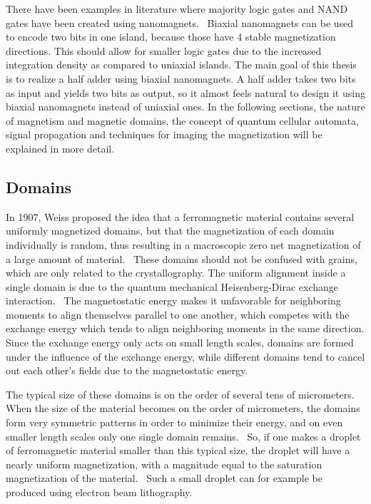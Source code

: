 \documentclass[11pt,a4paper,english]{article}
\begin{document}
There have been examples in literature where majority logic gates and NAND gates have been created using nanomagnets.~\cite{GYP-18} Biaxial nanomagnets can be used to encode two bits in one island, because those have 4 stable magnetization directions. This should allow for smaller logic gates due to the increased integration density as compared to uniaxial islands. The main goal of this thesis is to realize a half adder using biaxial nanomagnets. A half adder takes two bits as input and yields two bits as output, so it almost feels natural to design it using biaxial nanomagnets instead of uniaxial ones.
In the following sections, the nature of magnetism and magnetic domains, the concept of quantum cellular automata, signal propagation and techniques for imaging the magnetization will be explained in more detail.

\subsection{Domains}
In 1907, Weiss proposed the idea that a ferromagnetic material contains several uniformly magnetized domains, but that the magnetization of each domain individually is random, thus resulting in a macroscopic zero net magnetization of a large amount of material.~\cite{MuMax3_advances} These domains should not be confused with grains, which are only related to the crystallography. The uniform alignment inside a single domain is due to the quantum mechanical Heisenberg-Dirac exchange interaction.~\cite{MuMax3_advances, heisenberg1928theorie} The magnetostatic energy makes it unfavorable for neighboring moments to align themselves parallel to one another, which competes with the exchange energy which tends to align neighboring moments in the same direction. Since the exchange energy only acts on small length scales, domains are formed under the influence of the exchange energy, while different domains tend to cancel out each other's fields due to the magnetostatic energy. \par
The typical size of these domains is on the order of several tens of micrometers. When the size of the material becomes on the order of micrometers, the domains form very symmetric patterns in order to minimize their energy, and on even smaller length scales only one single domain remains.~\cite{NML_Carlton} So, if one makes a droplet of ferromagnetic material smaller than this typical size, the droplet will have a nearly uniform magnetization, with a magnitude equal to the saturation magnetization of the material.~\cite{NML_Carlton} Such a small droplet can for example be produced using electron beam lithography.~\cite{MQCA_RoomTemp, NML_Carlton} \par
\end{document}
